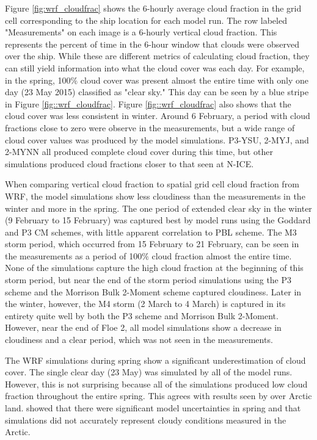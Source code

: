 Figure \ref{fig:wrf_cloudfrac} shows the 6-hourly average cloud fraction in the grid cell corresponding to the ship location for each model run. The row labeled "Measurements" on each image is a 6-hourly vertical cloud fraction. This represents the percent of time in the 6-hour window that clouds were observed over the ship. While these are different metrics of calculating cloud fraction, they can still yield information into what the cloud cover was each day. For example, in the spring, 100$\%$ cloud cover was present almost the entire time with only one day (23 May 2015) classified as "clear sky." This day can be seen by a blue stripe in Figure \ref{fig::wrf_cloudfrac}. Figure \ref{fig::wrf_cloudfrac} also shows that the cloud cover was less consistent in winter. Around 6 February, a period with cloud fractions close to zero were observe in the measurements, but a wide range of cloud cover values was produced by the model simulations. P3-YSU, 2-MYJ, and 2-MYNN all produced complete cloud cover during this time, but other simulations produced cloud fractions closer to that seen at N-ICE. 

When comparing vertical cloud fraction to spatial grid cell cloud fraction from WRF, the model simulations show less cloudiness than the measurements in the winter and more in the spring. The one period of extended clear sky in the winter (9 February to 15 February) was captured best by model runs using the Goddard and P3 CM schemes, with little apparent correlation to PBL scheme. The M3 storm period, which occurred from 15 February to 21 February, can be seen in the measurements as a period of 100$\%$ cloud fraction almost the entire time. None of the simulations capture the high cloud fraction at the beginning of this storm period, but near the end of the storm period simulations using the P3 scheme and the Morrison Bulk 2-Moment scheme captured cloudiness. Later in the winter, however, the M4 storm (2 March to 4 March) is captured in its entirety quite well by both the P3 scheme and Morrison Bulk 2-Moment. However, near the end of Floe 2, all model simulations show a decrease in cloudiness and a clear period, which was not seen in the measurements. 

The WRF simulations during spring show a significant underestimation of cloud cover. The single clear day (23 May) was simulated by all of the model runs. However, this is not surprising because all of the simulations produced low cloud fraction throughout the entire spring. This agrees with results seen by \citet{hines:2011} over Arctic land. \citet{hines:2011} showed that there were significant model uncertainties in spring and that simulations did not accurately represent cloudy conditions measured in the Arctic. 


